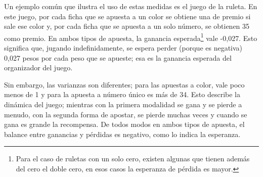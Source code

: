 \documentclass[]{book}
\let\rmarkdownfootnote\footnote%
\def\footnote{\protect\rmarkdownfootnote}
\begin{document}
Un ejemplo común que ilustra el uso de estas medidas es el juego de la
ruleta. En este juego, por cada ficha que se apuesta a un color se
obtiene una de premio si sale ese color y, por cada ficha que se apuesta
a un solo número, se obtienen 35 como premio. En ambos tipos de apuesta,
la ganancia esperada\footnote{Para el caso de ruletas con un solo cero, existen algunas que tienen además del cero el doble cero, en esos casos la esperanza de pérdida es mayor.} vale -0,027. Esto significa que, jugando
indefinidamente, se espera perder (porque es negativa) 0,027 pesos por
cada peso que se apueste; esa es la ganancia esperada del organizador
del juego.

Sin embargo, las varianzas son diferentes; para las apuestas a color,
vale poco menos de 1 y para la apuesta a número único es más de 34. Esto
describe la dinámica del juego; mientras con la primera modalidad se
gana y se pierde a menudo, con la segunda forma de apostar, se pierde
muchas veces y cuando se gana es grande la recompensa. De todos modos en
ambos tipos de apuesta, el balance entre ganancias y pérdidas es
negativo, como lo indica la esperanza.


\end{document}
